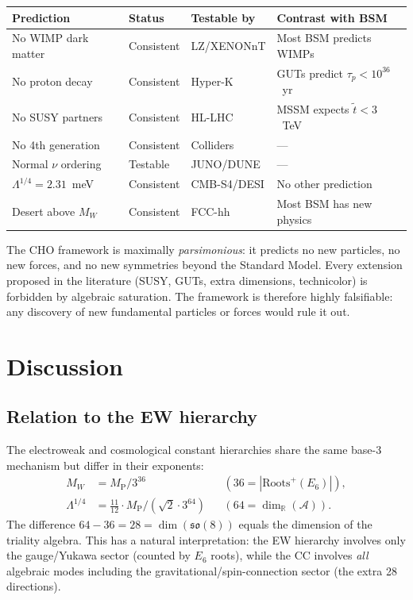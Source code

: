 \documentclass[12pt,a4paper]{article}
\theoremstyle{definition}
\theoremstyle{remark}
\newcommand{\Real}{\mathbb{R}}
\newcommand{\Alg}{\mathcal{A}}
\newcommand{\MP}{M_{\mathrm{P}}}
\begin{document}
\begin{center}
\begin{tabular}{llll}
\hline
\textbf{Prediction} & \textbf{Status} & \textbf{Testable by} & 
\textbf{Contrast with BSM} \\
\hline
No WIMP dark matter & Consistent & LZ/XENONnT & Most BSM predicts WIMPs \\
No proton decay & Consistent & Hyper-K & GUTs predict $\tau_p < 10^{36}$~yr \\
No SUSY partners & Consistent & HL-LHC & MSSM expects $\tilde{t} < 3$~TeV \\
No 4th generation & Consistent & Colliders & --- \\
Normal $\nu$ ordering & Testable & JUNO/DUNE & --- \\
$\Lambda^{1/4} = 2.31$~meV & Consistent & CMB-S4/DESI & No other prediction \\
Desert above $M_W$ & Consistent & FCC-hh & Most BSM has new physics \\
\hline
\end{tabular}
\end{center}

The CHO framework is maximally \emph{parsimonious}: it predicts no new 
particles, no new forces, and no new symmetries beyond the Standard Model. 
Every extension proposed in the literature (SUSY, GUTs, extra dimensions, 
technicolor) is forbidden by algebraic saturation. The framework is 
therefore highly falsifiable: any discovery of new fundamental particles 
or forces would rule it out.

\section{Discussion}
\label{sec:discussion}

\subsection{Relation to the EW hierarchy}

The electroweak and cosmological constant hierarchies share the same 
base-3 mechanism but differ in their exponents:
\begin{align}
M_W &= \MP/3^{36} && (36 = |\mathrm{Roots}^+(E_6)|), \\
\Lambda^{1/4} &= \tfrac{11}{12}\cdot\MP/(\sqrt{2}\cdot 3^{64}) && 
(64 = \dim_\Real(\Alg)).
\end{align}
The difference $64 - 36 = 28 = \dim(\mathfrak{so}(8))$ equals the 
dimension of the triality algebra. This has a natural interpretation: 
the EW hierarchy involves only the gauge/Yukawa sector (counted by $E_6$ 
roots), while the CC involves \emph{all} algebraic modes including the 
gravitational/spin-connection sector (the extra 28 directions).
\end{document}
